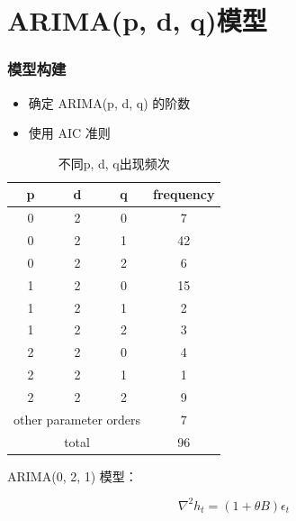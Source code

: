 \documentclass[11pt,compress,t, xcolor=table]{beamer}
\begin{document}
\section[ARIMA模型]{ARIMA(p, d, q)模型}

\begin{frame}
	\frametitle{模型构建}
	\begin{itemize}	
		\item 确定 ARIMA(p, d, q) 的阶数
		\smallskip	
		\item 使用 AIC 准则
	\end{itemize}	
	
	\begin{multicols}{2}
	
	\begin{table}[H]
		\footnotesize
		\caption{不同p, d, q出现频次}
		\begin{tabular}{cccc}
			\hline
			p            & d            & q            & frequency \\ \hline
			0            & 2            & 0            & 7         \\
			\rowcolor[HTML]{CBCEFB} 
			0            & 2            & 1            & 42        \\
			0            & 2            & 2            & 6         \\
			1            & 2            & 0            & 15        \\
			1            & 2            & 1            & 2         \\
			1            & 2            & 2            & 3         \\
			2            & 2            & 0            & 4         \\
			2            & 2            & 1            & 1         \\
			2            & 2            & 2            & 9         \\ \hline
			\multicolumn{3}{c}{other parameter orders} & 7         \\ \hline
			\multicolumn{3}{c}{total}                  & 96        \\ \hline
		\end{tabular}
	\end{table}
	
	ARIMA(0, 2, 1) 模型：
	
	$$\nabla^2 h_t = (1+\theta B)\epsilon_t$$
	
	\end{multicols}
	
	
	
\end{frame}
\end{document}
